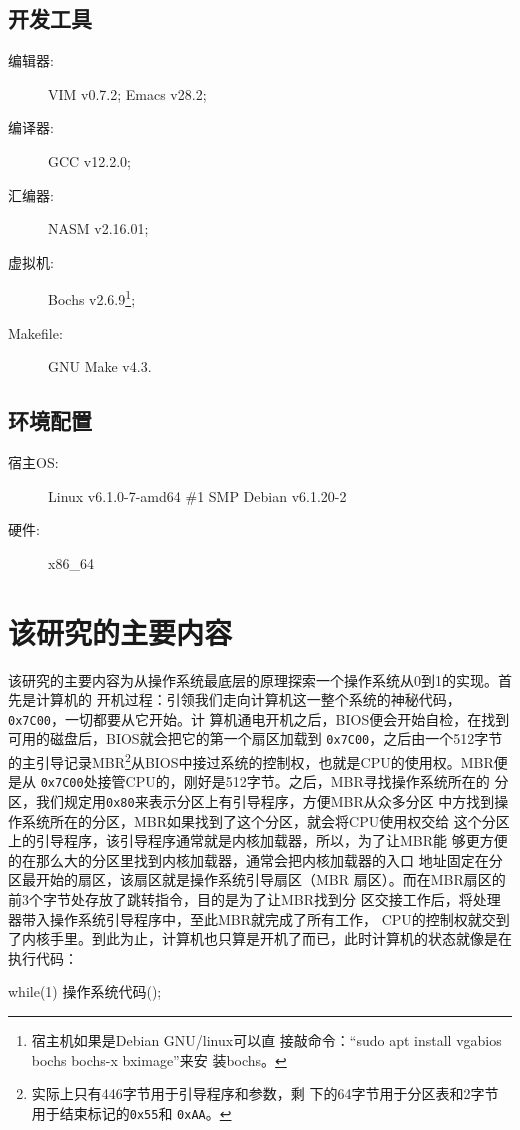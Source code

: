 \subsection{开发工具}

\begin{description}
\item[编辑器:] VIM v0.7.2; Emacs v28.2;
\item[编译器:] GCC v12.2.0;
\item[汇编器:] NASM v2.16.01;
\item[虚拟机:] Bochs v2.6.9\footnote{宿主机如果是Debian GNU/linux可以直
    接敲命令：“sudo apt install vgabios bochs bochs-x bximage”来安
    装bochs。};
\item[Makefile:] GNU Make v4.3.
\end{description}

\subsection{环境配置}

\begin{description}
\item[宿主OS:] Linux v6.1.0-7-amd64 \#1 SMP Debian v6.1.20-2
\item[硬件:] x86\_64
\end{description}

\section{该研究的主要内容}

该研究的主要内容为从操作系统最底层的原理探索一个操作系统从0到1的实现。首先是计算机的
开机过程：引领我们走向计算机这一整个系统的神秘代码，\texttt{0x7C00}，一切都要从它开始。计
算机通电开机之后，BIOS便会开始自检，在找到可用的磁盘后，BIOS就会把它的第一个扇区加载到
\texttt{0x7C00}，之后由一个512字节的主引导记录MBR\footnote{实际上只有446字节用于引导程序和参数，剩
  下的64字节用于分区表和2字节用于结束标记的\texttt{0x55}和
  \texttt{0xAA}。}从BIOS中接过系统的控制权，也就是CPU的使用权。MBR便是从
\texttt{0x7C00}处接管CPU的，刚好是512字节。之后，MBR寻找操作系统所在的
分区，我们规定用\texttt{0x80}来表示分区上有引导程序，方便MBR从众多分区
中方找到操作系统所在的分区，MBR如果找到了这个分区，就会将CPU使用权交给
这个分区上的引导程序，该引导程序通常就是内核加载器，所以，为了让MBR能
够更方便的在那么大的分区里找到内核加载器，通常会把内核加载器的入口
地址固定在分区最开始的扇区，该扇区就是操作系统引导扇区（MBR
扇区）。而在MBR扇区的前3个字节处存放了跳转指令，目的是为了让MBR找到分
区交接工作后，将处理器带入操作系统引导程序中，至此MBR就完成了所有工作，
CPU的控制权就交到了内核手里。到此为止，计算机也只算是开机了而已，此时计算机的状态就像是在执行代码：
\begin{codeblock}
\begin{ccode}
while(1)
{
  操作系统代码();
}
\end{ccode}  
\end{codeblock}

